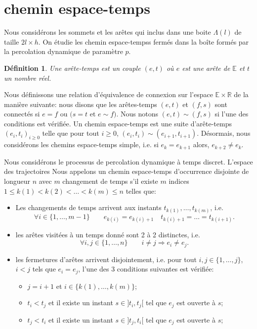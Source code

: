 \documentclass[titlepage,a4paper,12pt]{article}
\newcounter{d}
\newcounter{t}
\newcounter{p}
\newcounter{c}
\newcounter{a}
\newcounter{l}
\newtheorem{defi}[d]{Définition}
\begin{document}
\section{chemin espace-temps}
Nous considérons les sommets et les arêtes qui inclus dans une boite $\Lambda(l)$ de taille $2l\times h$. On étudie les chemin espace-tempss fermés dans la boîte formés par la percolation dynamique de paramètre $p$.
\begin{defi}
Une arête-temps est un couple $(e,t)$ où $e$ est une arête de $\mathbb{E}$ et $t$ un nombre réel. 
\end{defi}

Nous définissons une relation d'équivalence de connexion sur l'espace $\mathbb{E}\times \mathbb{R}$ de la manière suivante: nous disons que les arêtes-temps $(e,t)$ et $(f,s)$ sont connectés si $e=f$ ou $(s=t$ et $e\sim f)$. Nous notons $(e,t)\sim(f,s)$ si l'une des conditions est vérifiée. Un chemin espace-temps est une suite d'arête-temps $(e_i,t_i)_{i\geqslant 0}$ telle que pour tout $i\geqslant 0$, $(e_i,t_i)\sim(e_{i+1},t_{i+1})$. Désormais, nous considérons les chemins espace-temps simple, i.e. si $e_k = e_{k+1}$ alors, $e_{k+2} \neq e_k$.

Nous considérons le processus de percolation dynamique à temps discret. L'espace des trajectoires 
Nous appelons un chemin espace-temps d'occurrence disjointe de longueur $n$ avec $m$ changement de temps s'il existe $m$ indices $1\leqslant k(1)< k(2) < \dots < k(m) \leqslant n$ telles que:
\begin{itemize}[label = $\bullet$, leftmargin = *]
\item Les changements de temps arrivent aux instants $t_{k(1)},\dots, t_{k(m)}$, i.e.
$$\forall i\in \{1,\dots, m-1\} \qquad e_{k(i)} = e_{k(i)+1} \quad t_{k(i)+1} =\dots = t_{k(i+1)}.
$$
\item les arêtes visitées à un temps donné sont 2 à 2 distinctes, i.e.
$$ \forall i,j \in \{1,\dots, n\} \qquad i\neq j \Rightarrow e_i\neq e_j.
$$
\item les fermetures d'arêtes arrivent disjointement, i.e. pour tout $i,j\in \{1,\dots, j\}$, $i<j$ tels que $e_i = e_j$, l'une des 3 conditions suivantes est vérifiée:
\begin{itemize}
\item $j=i+1$ et $i\in \{k(1),\dots, k(m)\}$;
\item $t_i< t_j$ et il existe un instant $s\in ]t_i,t_j[$ tel que $e_j$ est ouverte à $s$;
\item $t_j< t_i$ et il existe un instant $s\in ]t_j,t_i[$ tel que $e_j$ est ouverte à $s$;
\end{itemize}
\end{itemize}
\end{document}

